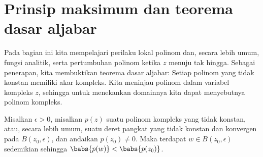 
\sectionnewpage
\section[Prinsip maksimum dan teorema dasar aljabar]{Prinsip maksimum dan teorema dasar aljabar}
\label{sec:fundalgeb}


Pada bagian ini kita mempelajari perilaku lokal polinom dan,
secara lebih umum, fungsi analitik,
serta pertumbuhan polinom ketika $z$ menuju tak hingga.
Sebagai penerapan, kita membuktikan teorema dasar aljabar:
Setiap polinom yang tidak konstan memiliki akar kompleks.
Kita meninjau polinom dalam variabel kompleks $z$,
sehingga untuk menekankan domainnya kita dapat menyebutnya polinom kompleks.

\begin{lemma} \label{lemma:polyalwaysgetssmaller}
Misalkan $\epsilon > 0$,
misalkan $p(z)$ suatu polinom kompleks yang tidak konstan, atau, secara lebih umum,
suatu deret pangkat yang tidak konstan dan konvergen pada $B(z_0,\epsilon)$,
dan andaikan $p(z_0) \neq 0$.
Maka terdapat $w \in B(z_0,\epsilon)$ sedemikian sehingga $\babs{p(w)} < \babs{p(z_0)}$.
\end{lemma}

